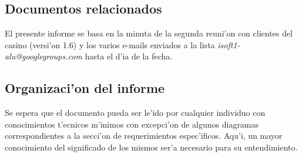 \subsection{ Documentos relacionados}
El presente informe se basa en la minuta de la segunda reuni'on con clientes del casino (versi'on 1.6) y los varios e-mails enviados a la lista \textit{isoft1-alu@googlegroups.com} hasta el d'ia de la fecha.


\subsection{ Organizaci'on del informe	}
Se espera que el documento pueda ser le'ido por cualquier individuo con conocimientos t'ecnicos m'inimos con excepci'on de algunos diagramas correspondientes a la secci'on de requerimientos espec'ificos. Aqu'i, un mayor conocimiento del significado de los mismos ser'a necesario para su entendimiento.



